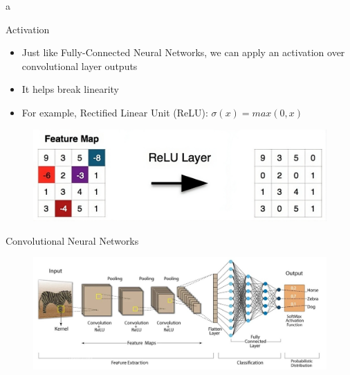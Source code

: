 a\documentclass[10pt]{beamer}
\theoremstyle{remark}
\theoremstyle{definition}
\begin{document}
\begin{frame}{Activation}

\begin{itemize}
    \item Just like Fully-Connected Neural Networks, we can apply an activation over convolutional layer outputs
    \item It helps break linearity
    \item For example, Rectified Linear Unit (ReLU): $\sigma(x) = max(0,x)$
\end{itemize}


\begin{figure}
\centering
\includegraphics[width=1.0\textwidth,height=0.6\textheight,keepaspectratio]{./images/activation_relu.jpeg}
\end{figure}

\end{frame}



\begin{frame}{Convolutional Neural Networks}
\begin{figure}
\centering
\includegraphics[width=1.0\textwidth,height=0.9\textheight,keepaspectratio]{./images/cnn_arch.jpeg}
\end{figure}
    
\end{frame}
\end{document}
